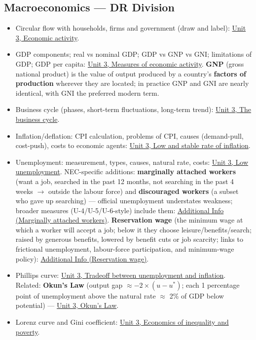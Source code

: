 \documentclass[a4paper,12pt]{article}
\begin{document}
\subsection*{Macroeconomics --- DR Division}
\begin{itemize}
  \item Circular flow with households, firms and government (draw and label): \hyperref[sec:economic-activity]{Unit 3, Economic activity}.
  \item GDP components; real vs nominal GDP; GDP vs GNP vs GNI; limitations of GDP; GDP per capita: \hyperref[sec:economic-activity]{Unit 3, Measures of economic activity}. \textbf{GNP} (gross national product) is the value of output produced by a country's \textbf{factors of production} wherever they are located; in practice GNP and GNI are nearly identical, with GNI the preferred modern term.
  \item Business cycle (phases, short-term fluctuations, long-term trend): \hyperref[sec:economic-activity]{Unit 3, The business cycle}.
  \item Inflation/deflation: CPI calculation, problems of CPI, causes (demand-pull, cost-push), costs to economic agents: \hyperref[sec:macro-obj-1]{Unit 3, Low and stable rate of inflation}.
  \item Unemployment: measurement, types, causes, natural rate, costs: \hyperref[sec:macro-obj-1]{Unit 3, Low unemployment}. NEC-specific additions: \textbf{marginally attached workers} (want a job, searched in the past 12 months, not searching in the past 4 weeks $\to$ outside the labour force) and \textbf{discouraged workers} (a subset who gave up searching) --- official unemployment understates weakness; broader measures (U-4/U-5/U-6-style) include them: \hyperref[sec:add-marginal]{Additional Info (Marginally attached workers)}. \textbf{Reservation wage} (the minimum wage at which a worker will accept a job; below it they choose leisure/benefits/search; raised by generous benefits, lowered by benefit cuts or job scarcity; links to frictional unemployment, labour-force participation, and minimum-wage policy): \hyperref[sec:add-reservation]{Additional Info (Reservation wage)}.
  \item Phillips curve: \hyperref[sec:macro-obj-1]{Unit 3, Tradeoff between unemployment and inflation}. Related: \textbf{Okun's Law} (output gap $\approx -2 \times (u - u^*)$; each 1 percentage point of unemployment above the natural rate $\approx$ 2\% of GDP below potential) --- \hyperref[sec:macro-obj-1]{Unit 3, Okun's Law}.
  \item Lorenz curve and Gini coefficient: \hyperref[sec:inequality-poverty]{Unit 3, Economics of inequality and poverty}.

\end{itemize}
\end{document}
